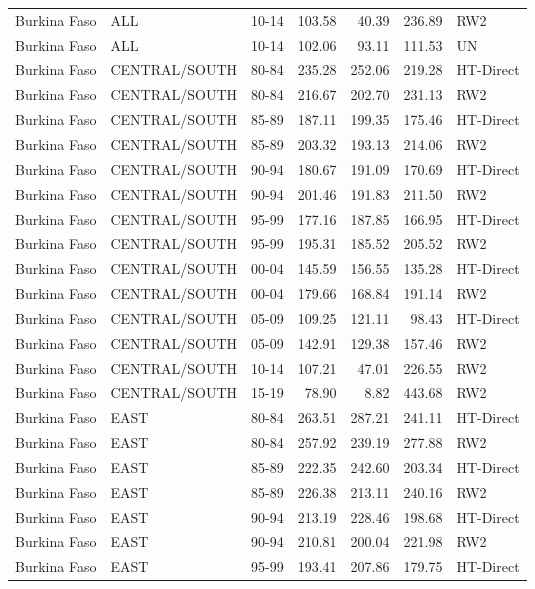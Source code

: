 \begin{longtable}{lllrrrl}
  Burkina Faso & ALL & 10-14 & 103.58 & 40.39 & 236.89 & RW2 \\ 
  Burkina Faso & ALL & 10-14 & 102.06 & 93.11 & 111.53 & UN \\ 
  Burkina Faso & CENTRAL/SOUTH & 80-84 & 235.28 & 252.06 & 219.28 & HT-Direct \\ 
  Burkina Faso & CENTRAL/SOUTH & 80-84 & 216.67 & 202.70 & 231.13 & RW2 \\ 
  Burkina Faso & CENTRAL/SOUTH & 85-89 & 187.11 & 199.35 & 175.46 & HT-Direct \\ 
  Burkina Faso & CENTRAL/SOUTH & 85-89 & 203.32 & 193.13 & 214.06 & RW2 \\ 
  Burkina Faso & CENTRAL/SOUTH & 90-94 & 180.67 & 191.09 & 170.69 & HT-Direct \\ 
  Burkina Faso & CENTRAL/SOUTH & 90-94 & 201.46 & 191.83 & 211.50 & RW2 \\ 
  Burkina Faso & CENTRAL/SOUTH & 95-99 & 177.16 & 187.85 & 166.95 & HT-Direct \\ 
  Burkina Faso & CENTRAL/SOUTH & 95-99 & 195.31 & 185.52 & 205.52 & RW2 \\ 
  Burkina Faso & CENTRAL/SOUTH & 00-04 & 145.59 & 156.55 & 135.28 & HT-Direct \\ 
  Burkina Faso & CENTRAL/SOUTH & 00-04 & 179.66 & 168.84 & 191.14 & RW2 \\ 
  Burkina Faso & CENTRAL/SOUTH & 05-09 & 109.25 & 121.11 & 98.43 & HT-Direct \\ 
  Burkina Faso & CENTRAL/SOUTH & 05-09 & 142.91 & 129.38 & 157.46 & RW2 \\ 
  Burkina Faso & CENTRAL/SOUTH & 10-14 & 107.21 & 47.01 & 226.55 & RW2 \\ 
  Burkina Faso & CENTRAL/SOUTH & 15-19 & 78.90 & 8.82 & 443.68 & RW2 \\ 
  Burkina Faso & EAST & 80-84 & 263.51 & 287.21 & 241.11 & HT-Direct \\ 
  Burkina Faso & EAST & 80-84 & 257.92 & 239.19 & 277.88 & RW2 \\ 
  Burkina Faso & EAST & 85-89 & 222.35 & 242.60 & 203.34 & HT-Direct \\ 
  Burkina Faso & EAST & 85-89 & 226.38 & 213.11 & 240.16 & RW2 \\ 
  Burkina Faso & EAST & 90-94 & 213.19 & 228.46 & 198.68 & HT-Direct \\ 
  Burkina Faso & EAST & 90-94 & 210.81 & 200.04 & 221.98 & RW2 \\ 
  Burkina Faso & EAST & 95-99 & 193.41 & 207.86 & 179.75 & HT-Direct \\ 

\end{longtable}
